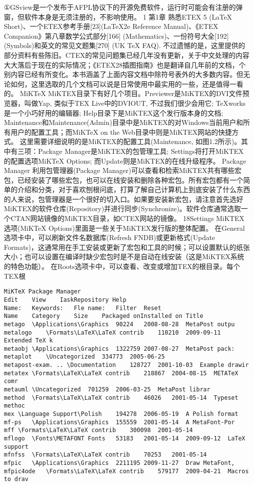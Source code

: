 \documentclass[UTF8]{ctexart}
\begin{document}
①GSview是一个发布于AFPL协议下的开源免费软件，运行时可能会有注册的弹窗，但软件本身是无须注册的，不影响使用。
1
第1章	熟悉ETEX	5
(LaTeX Short)、一个ETEX参考手册[23](LaTeX2e Reference Manual)、《ETEX Companion》第八章数学公式部分[166] (Mathematics)、一份符号大全[192] (Symbols)和英文的常见文题集[270] (UK TeX FAQ).
不过遗憾的是，这里提供的部分资料有些陈旧。CTEX的常见问题集已经几年没有更新，关于中文处理的内容大大落后于现在的实际情况；《ETEX28插图指南》也是翻译自几年前的文档，个别内容已经有所变化。本书涵盖了上面内容文档中除符号表外的大多数内容。但无论如何，这里选取的几个文档可以说是日常使用中最实用的一些，还是值得一看的。
MiKTeX
MiKTEX目录下有好几个项目。Previewer是MiKTEX的DVI文件预览器，叫做Yap, 类似于TEX Live中的DVIOUT, 不过我们很少会用它; TeXworks是一个小巧好用的编辑器; Help目录下是MiKTEX这个发行版本身的文档; Maintenance和Maintenance(Admin)目录中是MiKTEX的对Windows当前用户和所有用户的配置工具；而MiKTeX on the Web目录中则是MiKTEX网站的快捷方式。
这里需要详细说明的是MiKTEX的配置工具(Maintenance, 如图1.2所示)。其中有三项：Package Manager是MiKTEX的包管理工具; Settings将打开MiKTEX的配置选项MiKTeX Options; 而Update则是MiKTEX的在线升级程序。
Package Manager
利用包管理器(Package Manager)可以查看和检索MiKTEX共有哪些宏包，已经安装了哪些宏包，也可以在线安装和删除各种宏包。所有宏包都有一个简单的介绍和分类，对于喜欢刨根问底，打算了解自己计算机上到底安装了什么东西的人来说，包管理器是一个很好的切入口。如果要安装新宏包，请注意首先选好MiKTEX的软件仓库(Repository)并进行同步(Synchronize)。软件仓库通常选取一个CTAN网站镜像的MiKTEX目录，如CTEX网站的镜像。
18Settings
MiKTEX选项(MiKTeX Options)里面是一些关于MiKTEX发行版的整体配置。
在General选项卡中，可以刷新文件名数据库(Refresh FNDB)或更新格式(Update Formats)，这通常用在手工安装或更新了宏包和工具的时候；可以设置默认的纸张大小；也可以设置在编译时缺少宏包时是不是自动在线安装（这是MiKTEX系统的特色功能）。
在Roots选项卡中，可以查看、改变或增加TEX的根目录。每个TEX根

\begin{verbatim}
MiKTeX Package Manager
Edit	View	IaskRepository Help
Name:	Keywords:	Fle name:	Filter	Reset
Name	Category	Size	Packaged onInstalled on	Title
metago	\Applications\Graphics	90224	2008-08-28	MetaPost outpu
metalogo	\Formats\LaTeX\LaTeX contrib	110210	2009-09-11	Extended TeX k
metaobj	\Applications\Graphics	1322759	2007-08-27	MetaPost pack:
metaplot	\Uncategorized	334773	2005-06-25
metapost-exam. .. \Documentation	128727	2001-10-03	Example drawir
metatex	\Formats\LaTeX\LaTeX contrib	218867	2004-08-15	METATeX comr
metauml	\Uncategorized	701259	2006-03-25	MetaPost librar
method	\Formats\LaTeX\LaTeX contrib	46026	2001-05-14	Typeset methoc
mex	\Language Support\Polish	194278	2006-05-19	A Polish format
mf-ps	\Applications\Graphics	155559	2001-05-14	A MetaFont-Por
mff	\Formats\LaTeX\LaTeX contrib	300098	2001-05-14
mflogo	\Fonts\METAFONT Fonts	53183	2001-05-14	2009-09-12	LaTeX support
mfnfss	\Formats\LaTeX\LaTeX contrib	70253	2001-05-14
mfpic	\Applications\Graphics	2211195	2009-11-27	Draw MetaFont,
mfpic4ode	\Formats\LaTeX\LaTeX contrib	579177	2009-04-21	Macros to drav
\end{verbatim}
\end{document}
